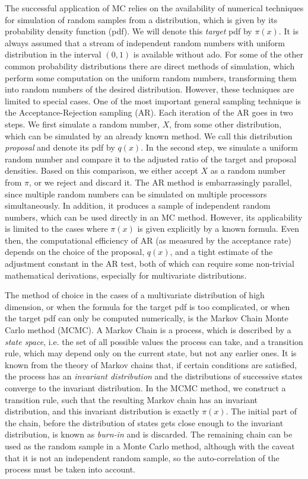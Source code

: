 \documentclass[11pt]{article}       %
\begin{document}
The successful application of MC relies on the availability of numerical
techniques for simulation of random samples from a distribution, which is given
by its probability density function (pdf).  We will denote this \emph{target}
pdf by $\pi(x)$.  It is always assumed that a stream of independent random
numbers with uniform distribution in the interval $(0,1)$ is available without
ado.  For some of the other common probability distributions there are direct
methods of simulation, which perform some computation on the uniform random
numbers, transforming them into random numbers of the desired distribution.
However, these techniques are limited to special cases.  One of the most
important general sampling technique is the Acceptance-Rejection sampling (AR).
Each iteration of the AR goes in two steps.  We first simulate a random number,
$X$, from some other distribution, which can be simulated by an already known
method.  We call this distribution \emph{proposal} and denote its pdf by
$q(x)$.  In the second step, we simulate a uniform random number and compare it
to the adjusted ratio of the target and proposal densities.  Based on this
comparison, we either accept $X$ as a random number from $\pi$, or we reject
and discard it.  The AR method is embarrassingly parallel, since multiple
random numbers can be simulated on multiple processors simultaneously.  In
addition, it produces a sample of independent random numbers, which can be used
directly in an MC method.  However, its applicability is limited to the cases
where $\pi(x)$ is given explicitly by a known formula.  Even then, the
computational efficiency of AR (as measured by the acceptance rate) depends on
the choice of the proposal, $q(x)$, and a tight estimate of the adjustment
constant in the AR test, both of which can require some non-trivial
mathematical derivations, especially for multivariate distributions.  

The method of choice in the cases of a multivariate distribution of high
dimension, or when the formula for the target pdf is too complicated, or when
the target pdf can only be computed numerically, is the Markov Chain Monte
Carlo method (MCMC).  A Markov Chain is a process, which is described by a
\emph{state space}, i.e. the set of all possible values the process can take,
and a transition rule, which may depend only on the current state, but not any
earlier ones. It is known from the theory of Markov chains that, if certain
conditions are satisfied, the process has an \emph{invariant distribution} and
the distributions of successive states converge to the invariant distribution.
In the MCMC method, we construct a transition rule, such that the resulting
Markov chain has an invariant distribution, and this invariant distribution is
exactly $\pi(x)$.  The initial part of the chain, before the distribution of
states gets close enough to the invariant distribution, is known as
\emph{burn-in} and is discarded.  The remaining chain can be used as the random
sample in a Monte Carlo method, although with the caveat that it is not an
independent random sample, so the auto-correlation of the process must be taken
into account.  
\end{document}
